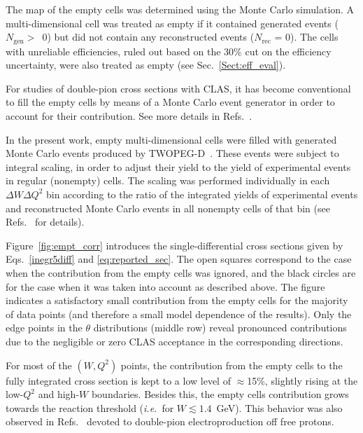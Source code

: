 \documentclass[prc,twocolumn,superscriptaddress,showpacs,amssymb,amsmath,amsfonts,aps,nofootinbib]{revtex4-1}
\begin{document}
The map of the empty cells was determined using the Monte Carlo simulation. A multi-dimensional cell was treated as empty if it contained generated events ($N_{\text{gen}} >$~0) but did not contain any reconstructed events ($N_{\text{rec}}$ = 0). The cells with unreliable efficiencies, ruled out based on the 30\% cut on the efficiency uncertainty, were also treated as empty (see Sec.\!~\ref{Sect:eff_eval}).


For studies of double-pion cross sections with CLAS, it has become conventional to fill the empty cells by means of a Monte Carlo event generator in order to account for their contribution. See more details in Refs.\!~\cite{Rip_an_note:2002,Ripani:2002ss,Fed_an_note:2007,Fedotov:2008aa,Isupov:2017lnd,Arjun,Fed_an_note:2017,Fed_paper_2018}.


In the present work, empty multi-dimensional cells were filled with generated Monte Carlo events produced by TWOPEG-D~\cite{twopeg-d}. These events were subject to integral scaling, in order to adjust their yield to the yield of experimental events in regular (nonempty) cells. The scaling was performed individually in each $\Delta W\Delta Q^2$ bin according to the ratio of the integrated yields of experimental events and reconstructed Monte Carlo events in all nonempty cells of that bin (see Refs.\!~\cite{my_an_note:2020, my_thesis:2021} for details). 


Figure~\ref{fig:empt_corr} introduces the single-differential cross sections given by Eqs.\!~\eqref{inegr5diff} and \eqref{eq:reported_sec}. The open squares correspond to the case when the contribution from the empty cells was ignored, and the black circles are for the case when it was taken into account as described above. The figure indicates a satisfactory small contribution from the empty cells for the majority of data points (and therefore a small model dependence of the results). Only the edge points in the $\theta$ distributions (middle row) reveal pronounced contributions due to the negligible or zero CLAS acceptance in the corresponding directions.

For most of the $(W,Q^2)$ points, the contribution from the empty cells to the fully integrated cross section is kept to a low level of $\approx$15\%, slightly rising at the low-$Q^{2}$ and high-$W$ boundaries. Besides this, the empty cells contribution grows towards the reaction threshold ({\it i.e.}~for $W\lesssim 1.4$~GeV). This behavior was also observed in Refs.\!~\cite{Fed_an_note:2017,Fed_paper_2018,Fed_an_note:2007,Fedotov:2008aa} devoted to double-pion electroproduction off free protons.
\end{document}
